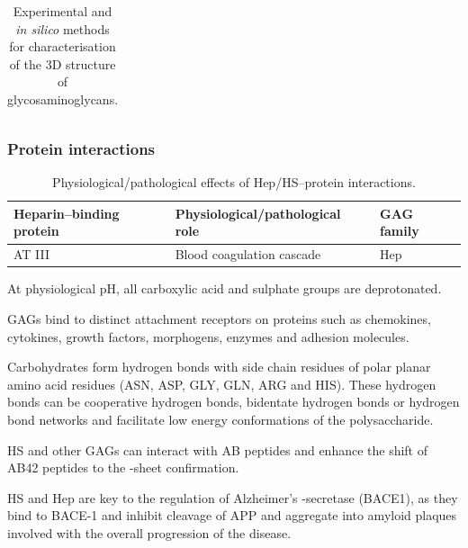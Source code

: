 \documentclass[journal=jctcce,manuscript=article]{achemso}
\begin{document}
{{\begin{table}[bl!]
\begin{tabular}{p{2cm}p{5.5cm}p{7.5cm}}
    \end{tabular}
    \caption{Experimental and \textit{in silico} methods for characterisation of the 3D structure of glycosaminoglycans.}
    \label{tab:GAGprotein}
\end{table}
}




\newpage

\subsubsection{Protein interactions}
{\renewcommand{\arraystretch}{1.5}
\begin{table}[b!]
    \begin{tabular}{p{5cm}p{6cm}p{3cm}}
        \hline
        Heparin--binding protein & Physiological/pathological role & GAG family  \\
        \hline
        AT III & Blood coagulation cascade & Hep 
    \end{tabular}
    \caption{Physiological/pathological effects of Hep/HS--protein interactions.}
    \label{tab:GAGprotein}
\end{table}
}

At physiological pH, all carboxylic acid and sulphate groups are deprotonated. 


\acp{GAG} bind to distinct attachment receptors on proteins such as chemokines, cytokines, growth factors, morphogens, enzymes and adhesion molecules\cite{Murphy2007StructuralHeparin, Iozzo2001HeparanArena, Kreuger2006InteractionsSpecificity, Kowitsch2018MedicalReview}. 

Carbohydrates form hydrogen bonds with side chain residues of polar planar amino acid residues (ASN, ASP, GLY, GLN, ARG and HIS)\cite{Malik2007SequenceNetwork}.
These hydrogen bonds can be cooperative hydrogen bonds, bidentate hydrogen bonds or hydrogen bond networks and facilitate low energy conformations of the polysaccharide.\cite{Quiocho1989Protein-carbohydrateFeatures} 

\ac{HS} and other \acp{GAG} can interact with AB peptides and enhance the shift of AB42 peptides to the \textbeta-sheet confirmation.

\ac{HS} and \ac{Hep} are key to the regulation of Alzheimer's  \textbeta-secretase (BACE1), as they bind to BACE-1 and inhibit cleavage of \ac{APP} and aggregate into amyloid plaques involved with the overall progression of the disease.\cite{Swarup2013SugarNeurons,Scholefield2003HeparanBeta-secretase.}

}
\end{document}
